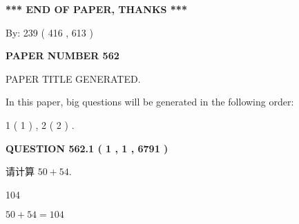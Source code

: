 \documentclass{ctexart}
\begin{document}
   
   
   
\vspace{1.0in} 
{\textbf{\large{ *** END OF PAPER, THANKS *** }}} 
   
   
\hspace{1.0in} By: 
 239 ( 416 ,  613 )
   
   
   
   
\newpage 
\setcounter{page}{ 
   562001 } 
   
   
   
   
 {\textbf{ \Large{ PAPER NUMBER  562  }}}
   
   
\vspace{0.2in}
   
   
   
   
   
   
   
   
 \vspace{0.2in}
 
 
 
 
   
   
 PAPER TITLE GENERATED.
   
   
   
\vspace{0.2in}
   
In this paper, big questions will be generated in the following order: 
   
   
   1 ( 1 )
 ,
   2 ( 2 )
 .
  
\vspace{0.2in}
  
{\textbf{\Large{QUESTION
562.1 
 ( 1 , 1 , 6791 )
}}}
  
  
 
请计算 $ %
50 +  %
54 $.
 
 
 
\noindent{}
 
 

104
 
 
\noindent{}
 
 

 
 
 
\noindent{}
 
 

$ %
50 +  %
54=   %
104$
 
\end{document}
